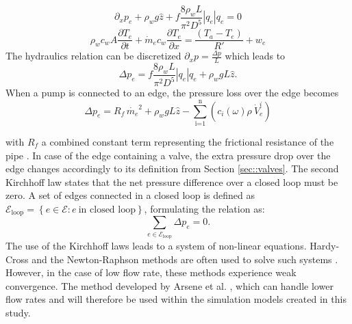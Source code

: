 \begin{equation}\label{eq::formom}
\partial_x p_e + \rho_w g \hat{z} + f \frac{8\rho_w L}{\pi^2 D^5}\left|q_e\right|q_e =0
\end{equation}
\begin{equation}\label{eq::forsimpipePDE}
\rho_w c_w A \frac{\partial T_e}{\partial t} + \dot{m}_e c_w \frac{\partial T_e}{\partial x}=\frac{\left(T_a-T_e\right)}{R'} + w_e
\end{equation}
The hydraulics relation can be  discretized $\partial_x p = \frac{\Delta p}{L}$ which leads to
\begin{equation}\label{eq::thermopde}
    \Delta p_e = f \frac{8\rho_w L}{\pi^2 D^5}\left|q_e\right|q_e + \rho_w g L \hat{z}.
\end{equation}
When a pump is connected to an edge, the pressure loss over the edge becomes
\begin{equation}
    \Delta p_e = R_{f}\,\dot{m_e}^2 + \rho_w g L \hat{z} - \sum^{\text{n}}_{\text{i=1}} \left( c_i(\omega)  \rho \ \dot{V}^{i}_e \right)
\end{equation}

with $R_{f}$ a combined constant term representing the frictional resistance of the pipe \cite{sibeijn2025economic}. In case of the edge containing a valve, the extra pressure drop over the edge changes accordingly to its definition from Section \ref{sec::valves}. The second Kirchhoff law states that the net pressure difference over a closed loop must be zero. A set of edges connected in a closed loop is defined as $\mathcal{E}_{\text{loop}} = \left\{e \in \mathcal{E}: e \ \text{in closed loop}\right\}$, formulating the relation as:
\begin{equation}
    \sum_{e  \in \mathcal{E}_{\text{loop}}} \Delta p_e = 0.
\end{equation}
The use of the Kirchhoff laws leads to a system of non-linear equations. Hardy-Cross and the Newton-Raphson methods are often used to solve such systems \cite{KUNTUAROVA}. However, in the case of low flow rate, these methods experience weak convergence. The method developed by Arsene et al. \cite{ARSENE}, which can handle lower flow rates and will therefore be used within the simulation models created in this study.


